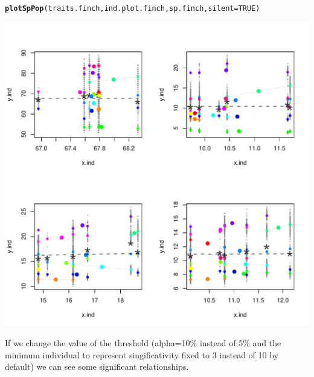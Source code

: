 \documentclass[12pt]{article}\usepackage[]{graphicx}\usepackage[]{color}
\makeatletter
\def\maxwidth{ %
  \ifdim\Gin@nat@width>\linewidth
    \linewidth
  \else
    \Gin@nat@width
  \fi
}
\newcommand{\hlnum}[1]{\textcolor[rgb]{0.686,0.059,0.569}{#1}}%
\newcommand{\hlstd}[1]{\textcolor[rgb]{0.345,0.345,0.345}{#1}}%
\newcommand{\hlkwc}[1]{\textcolor[rgb]{0.333,0.667,0.333}{#1}}%
\newcommand{\hlkwd}[1]{\textcolor[rgb]{0.737,0.353,0.396}{\textbf{#1}}}%
\newenvironment{kframe}{%
 \def\at@end@of@kframe{}%
 \ifinner\ifhmode%
  \def\at@end@of@kframe{\end{minipage}}%
  \begin{minipage}{\columnwidth}%
 \fi\fi%
 \def\FrameCommand##1{\hskip\@totalleftmargin \hskip-\fboxsep
 \colorbox{shadecolor}{##1}\hskip-\fboxsep
     \hskip-\linewidth \hskip-\@totalleftmargin \hskip\columnwidth}%
 \MakeFramed {\advance\hsize-\width
   \@totalleftmargin\z@ \linewidth\hsize
   \@setminipage}}%
 {\par\unskip\endMakeFramed%
 \at@end@of@kframe}
\newenvironment{knitrout}{}{} %
\makeatother
\begin{document}
\begin{knitrout}
\color{fgcolor}\begin{kframe}
\begin{alltt}
\hlkwd{plotSpPop}\hlstd{(traits.finch, ind.plot.finch, sp.finch,} \hlkwc{silent}\hlstd{=}\hlnum{TRUE}\hlstd{)}
\end{alltt}
\end{kframe}
\includegraphics[width=\maxwidth]{figure/unnamed-chunk-25} 

\end{knitrout}

If we change the value of the threshold (alpha=10\% instead of 5\% and the minimum individual to represent singificativity fixed to 3 instead of 10 by default) we can see some significant relationships.

\newpage
\end{document}
